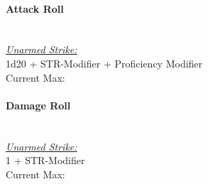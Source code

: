 {\paragraph*{Attack Roll}\hfill\\
\underline{\textit{Unarmed Strike:}}\\
1d20 + STR-Modifier + Proficiency Modifier\\
\indent Current Max: 
\paragraph*{Damage Roll}\hfill\\
\underline{\textit{Unarmed Strike:}}\\
1 + STR-Modifier\\
\indent Current Max: 
}